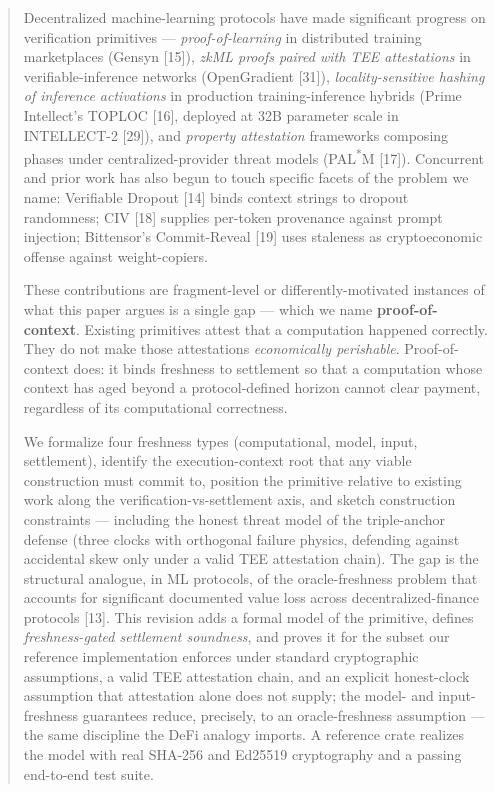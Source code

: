 \documentclass[11pt]{article}
\begin{document}
\begin{abstract}
Decentralized machine-learning protocols have made significant progress on verification primitives --- \emph{proof-of-learning} in distributed training marketplaces (Gensyn [15]), \emph{zkML proofs paired with TEE attestations} in verifiable-inference networks (OpenGradient [31]), \emph{locality-sensitive hashing of inference activations} in production training-inference hybrids (Prime Intellect's TOPLOC [16], deployed at 32B parameter scale in INTELLECT-2 [29]), and \emph{property attestation} frameworks composing phases under centralized-provider threat models (PAL\textsuperscript{*}M [17]). Concurrent and prior work has also begun to touch specific facets of the problem we name: Verifiable Dropout [14] binds context strings to dropout randomness; CIV [18] supplies per-token provenance against prompt injection; Bittensor's Commit-Reveal [19] uses staleness as cryptoeconomic offense against weight-copiers.

These contributions are fragment-level or differently-motivated instances of what this paper argues is a single gap --- which we name \textbf{proof-of-context}. Existing primitives attest that a computation happened correctly. They do not make those attestations \emph{economically perishable}. Proof-of-context does: it binds freshness to settlement so that a computation whose context has aged beyond a protocol-defined horizon cannot clear payment, regardless of its computational correctness.

We formalize four freshness types (computational, model, input, settlement), identify the execution-context root that any viable construction must commit to, position the primitive relative to existing work along the verification-vs-settlement axis, and sketch construction constraints --- including the honest threat model of the triple-anchor defense (three clocks with orthogonal failure physics, defending against accidental skew only under a valid TEE attestation chain). The gap is the structural analogue, in ML protocols, of the oracle-freshness problem that accounts for significant documented value loss across decentralized-finance protocols [13]. This revision adds a formal model of the primitive, defines \emph{freshness-gated settlement soundness}, and proves it for the subset our reference implementation enforces under standard cryptographic assumptions, a valid TEE attestation chain, and an explicit honest-clock assumption that attestation alone does not supply; the model- and input-freshness guarantees reduce, precisely, to an oracle-freshness assumption --- the same discipline the DeFi analogy imports. A reference crate realizes the model with real SHA-256 and Ed25519 cryptography and a passing end-to-end test suite.
\end{abstract}
\end{document}
